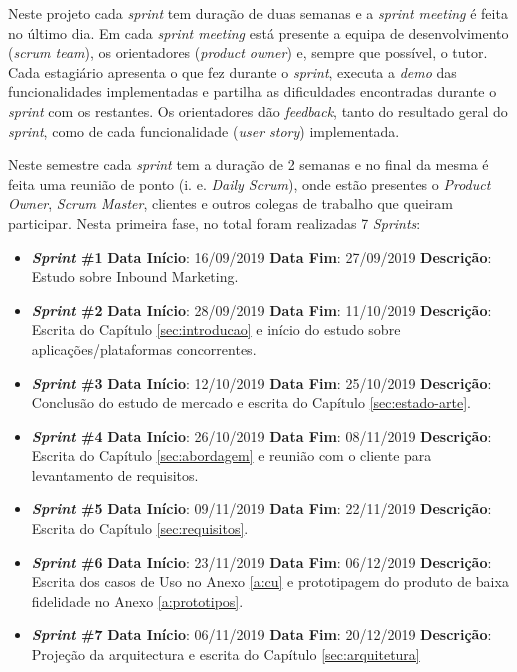 Neste projeto cada \textit{sprint} tem duração de duas semanas e a \textit{sprint meeting} é feita no último dia. Em cada\textit{ sprint meeting }está presente a equipa de desenvolvimento (\textit{scrum team}), os orientadores (\textit{product owner}) e, sempre que possível, o tutor. Cada estagiário apresenta o que fez durante o \textit{sprint}, executa a \textit{demo} das funcionalidades implementadas e partilha as dificuldades encontradas durante o \textit{sprint }com os restantes. Os orientadores dão \textit{feedback}, tanto do resultado geral do \textit{sprint}, como de cada funcionalidade (\textit{user story}) implementada.


Neste semestre cada \textit{sprint} tem a duração de 2 semanas e no final da mesma é feita uma reunião de ponto (i. e. \textit{Daily Scrum}), onde estão presentes o \textit{Product Owner}, \textit{Scrum Master}, clientes e outros colegas de trabalho que queiram participar. Nesta primeira fase, no total foram realizadas 7 \textit{Sprints}:

\begin{itemize}
	\item \textbf{\textit{Sprint} \#1}
		\subitem \textbf{Data Início}: 16/09/2019
		\subitem \textbf{Data Fim}: 27/09/2019
		\subitem \textbf{Descrição}: Estudo sobre Inbound Marketing.
	\item \textbf{\textit{Sprint} \#2}
		\subitem \textbf{Data Início}: 28/09/2019
		\subitem \textbf{Data Fim}: 11/10/2019
		\subitem \textbf{Descrição}: Escrita do Capítulo \ref{sec:introducao} e início do estudo sobre aplicações/plataformas concorrentes.
	\item \textbf{\textit{Sprint} \#3}
		\subitem \textbf{Data Início}: 12/10/2019
		\subitem \textbf{Data Fim}: 25/10/2019
		\subitem \textbf{Descrição}: Conclusão do estudo de mercado e escrita do Capítulo \ref{sec:estado-arte}.
	\item \textbf{\textit{Sprint} \#4}
		\subitem \textbf{Data Início}: 26/10/2019
		\subitem \textbf{Data Fim}: 08/11/2019
		\subitem \textbf{Descrição}: Escrita do Capítulo \ref{sec:abordagem} e reunião com o cliente para levantamento de requisitos.
	\item \textbf{\textit{Sprint} \#5}
		\subitem \textbf{Data Início}: 09/11/2019
		\subitem \textbf{Data Fim}: 22/11/2019
		\subitem \textbf{Descrição}: Escrita do Capítulo \ref{sec:requisitos}.
	\item \textbf{\textit{Sprint} \#6}
		\subitem \textbf{Data Início}: 23/11/2019
		\subitem \textbf{Data Fim}: 06/12/2019
		\subitem \textbf{Descrição}:  Escrita dos casos de Uso no Anexo \ref{a:cu} e prototipagem do produto de baixa fidelidade no Anexo \ref{a:prototipos}.
	\item \textbf{\textit{Sprint} \#7}
		\subitem \textbf{Data Início}: 06/11/2019
		\subitem \textbf{Data Fim}: 20/12/2019
		\subitem \textbf{Descrição}: Projeção da arquitectura e escrita do Capítulo \ref{sec:arquitetura}
\end{itemize}

